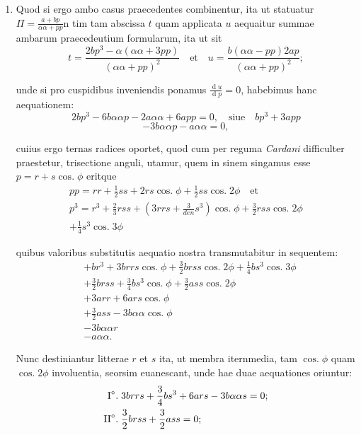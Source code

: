 \documentclass[10pt,a4paper]{article}
\DeclareMathOperator{\cosg}{cos.}
\begin{document}
\begin{paracol}{2}
\begin{enumerate}[topsep=1px]
		\item Quod si ergo ambo casus praecedentes combinentur, ita ut statuatur $\Pi=\frac{a + bp}{\alpha \alpha + pp}$n tim tam abscissa $t$ quam applicata $u$ aequaitur summae ambarum praecedeutium formularum, ita ut sit
		\[
			t = \frac{2bp^3 - \alpha(\alpha \alpha + 3pp)}{(\alpha \alpha + pp)^2} \quad \text{et} \quad u = \frac{b(\alpha \alpha - pp)2ap}{(\alpha \alpha + pp)^2};
		\]
		\par unde si pro cuspidibus inveniendis ponamus $\frac{\operatorname{d}u}{\operatorname{d}p} = 0$, habebimus hanc aequationem:
		\[
			2bp^3-6b\alpha \alpha p -2a \alpha \alpha +6a pp = 0, \quad \text{siue} \quad bp^3+3app
		\]
		\[
			-3b\alpha \alpha p - a\alpha \alpha = 0,
		\]
		\par cuiius ergo ternas radices oportet, quod cum per reguma \textit{Cardani} difficulter praestetur, trisectione anguli, utamur, quem in sinem singamus esse $p=r+s\cosg \phi$ eritque
		\begin{align*}
			pp = rr + \frac{1}{2}ss +2rs \cosg\phi + \frac{1}{2}ss \cosg 2\phi \quad \text{et}\\
			p^3=r^3+\frac{2}{3}rss + (3rrs+\frac{3}{den}s^3)\cosg \phi + \frac{3}{2} rss \cosg 2\phi\\
			+\frac{1}{4}s^3\cosg 3\phi
		\end{align*}
		\par quibus valoribus substitutis aequatio nostra transmutabitur in sequentem:
		\begin{align*}
			&+br^3+3brrs \cosg \phi + \frac{3}{2}brss \cosg 2\phi+ \frac{1}{4}bs^3\cosg 3\phi\\
			&+\frac{3}{2}brss + \frac{3}{4}bs^3\cosg \phi + \frac{3}{2}ass \cosg 2\phi\\
			&+3arr + 6ars \cosg \phi\\
			&+\frac{3}{2}ass - 3b\alpha \alpha \cosg \phi\\
			&-3b\alpha \alpha r\\
			&-a \alpha \alpha.
		\end{align*}
		\par Nunc destiniantur litterae $r$ et $s$ ita, ut membra iternmedia, tam $\cosg \phi$ quam $\cosg 2\phi$ involuentia, seorsim euanescant, unde hae duae aequationes oriuntur:
		\begin{align*}
			\text{I}\degree.\; &3brrs + \frac{3}{4}bs^3+6ars-3b\alpha \alpha s = 0;\\
			\text{II}\degree.\;& \frac{3}{2}brss+\frac{3}{2}ass = 0;
		\end{align*}

\end{enumerate}
\end{paracol}
\end{document}
